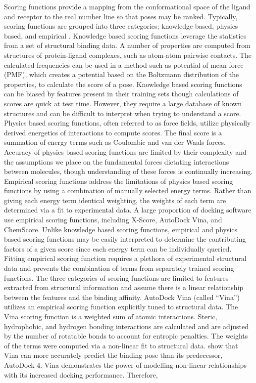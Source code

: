 \documentclass[journal=jcisd8,manuscript=article]{achemso}
\begin{document}
Scoring functions provide a mapping from the conformational space of the ligand and receptor to the real number line so that poses may be ranked. Typically, scoring functions are grouped into three categories; knowledge based, physics based, and empirical \cite{kitchen2004docking}. Knowledge based scoring functions leverage the statistics from a set of structural binding data. A number of properties are computed from structures of protein-ligand complexes, such as atom-atom pairwise contacts. The calculated frequencies can be used in a method such as potential of mean force (PMF), which creates a potential based on the Boltzmann distribution of the properties, to calculate the score of a pose\cite{muegge1999general,muegge2000knowledge}. Knowledge based scoring functions can be biased by features present in their training sets though calculations of scores are quick at test time\cite{kitchen2004docking}. However, they require a large database of known structures and can be difficult to interpret when trying to understand a score\cite{brooijmans2003molecular}. Physics based scoring functions, often referred to as force fields, utilize physically derived energetics of interactions to compute scores. The final score is a summation of energy terms such as Coulombic and van der Waals forces\cite{huang2006molecular}. Accuracy of physics based scoring functions are limited by their complexity and the assumptions we place on the fundamental forces dictating interactions between molecules, though understanding of these forces is continually increasing\cite{liu2015classification}. Empirical scoring functions address the limitations of physics based scoring functions by using a combination of manually selected energy terms. Rather than giving each energy term identical weighting, the weights of each term are determined via a fit to experimental data. A large proportion of docking software use empirical scoring functions, including X-Score, AutoDock Vina, and ChemScore\cite{wang2002further,trott2010autodock,eldridge1997empirical}. Unlike knowledge based scoring functions, empirical and physics based scoring functions may be easily interpreted to determine the contributing factors of a given score since each energy term can be individually queried. Fitting empirical scoring function requires a plethora of experimental structural data and prevents the combination of terms from separately trained scoring functions. The three categories of scoring functions are limited to features extracted from structural information and assume there is a linear relationship between the features and the binding affinity. AutoDock Vina (called ``Vina'') utilizes an empirical scoring function explicitly tuned to structural data\cite{trott2010autodock}. The Vina scoring function is a weighted sum of atomic interactions.  Steric, hydrophobic, and hydrogen bonding interactions are calculated and are adjusted by the number of rotatable bonds to account for entropic penalties. The weights of the terms were computed via a non-linear fit to structural data. \citet{nguyen2019autodock} show that Vina can more accurately predict the binding pose than its predecessor, AutoDock 4\cite{morris1998automated}. Vina demonstrates the power of modelling non-linear relationships with its increased docking performance. Therefore, 
\end{document}
